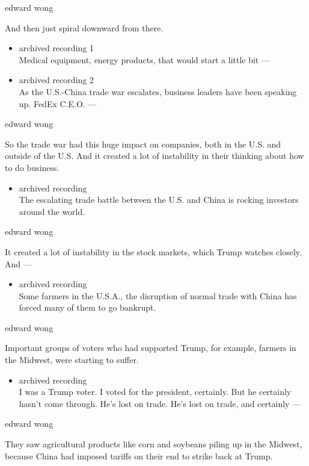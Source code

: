 edward wong

And then just spiral downward from there.

\begin{itemize}
\item
  archived recording 1\\
  Medical equipment, energy products, that would start a little bit ---
\item
  archived recording 2\\
  As the U.S.-China trade war escalates, business leaders have been
  speaking up. FedEx C.E.O. ---
\end{itemize}

edward wong

So the trade war had this huge impact on companies, both in the U.S. and
outside of the U.S. And it created a lot of instability in their
thinking about how to do business.

\begin{itemize}
\tightlist
\item
  archived recording\\
  The escalating trade battle between the U.S. and China is rocking
  investors around the world.
\end{itemize}

edward wong

It created a lot of instability in the stock markets, which Trump
watches closely. And ---

\begin{itemize}
\tightlist
\item
  archived recording\\
  Some farmers in the U.S.A., the disruption of normal trade with China
  has forced many of them to go bankrupt.
\end{itemize}

edward wong

Important groups of voters who had supported Trump, for example, farmers
in the Midwest, were starting to suffer.

\begin{itemize}
\tightlist
\item
  archived recording\\
  I was a Trump voter. I voted for the president, certainly. But he
  certainly hasn't come through. He's lost on trade. He's lost on trade,
  and certainly ---
\end{itemize}

edward wong

They saw agricultural products like corn and soybeans piling up in the
Midwest, because China had imposed tariffs on their end to strike back
at Trump.

